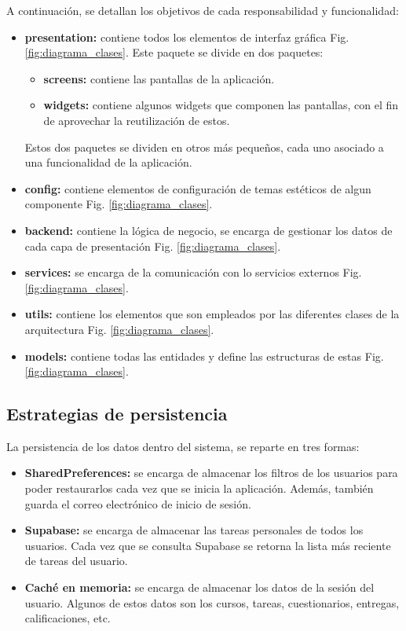 A continuación, se detallan los objetivos de cada responsabilidad y funcionalidad:
\begin{itemize}
    \item \textbf{presentation:} contiene todos los elementos de interfaz gráfica Fig. \ref{fig:diagrama_clases}. Este paquete se divide en dos paquetes:
        \begin{itemize}
            \item \textbf{screens:} contiene las pantallas de la aplicación.
            \item \textbf{widgets:} contiene algunos widgets que componen las pantallas, con el fin de aprovechar la reutilización de estos.
        \end{itemize}
        Estos dos paquetes se dividen en otros más pequeños, cada uno asociado a una funcionalidad de la aplicación.
    \item \textbf{config:} contiene elementos de configuración de temas estéticos de algun componente Fig. \ref{fig:diagrama_clases}.
    \item \textbf{backend:} contiene la lógica de negocio, se encarga de gestionar los datos de cada capa de presentación Fig. \ref{fig:diagrama_clases}.
    \item \textbf{services:} se encarga de la comunicación con lo servicios externos Fig. \ref{fig:diagrama_clases}.
    \item \textbf{utils:} contiene los elementos que son empleados por las diferentes clases de la arquitectura Fig. \ref{fig:diagrama_clases}.
    \item \textbf{models:} contiene todas las entidades y define las estructuras de estas Fig. \ref{fig:diagrama_clases}.
\end{itemize}

\subsection{Estrategias de persistencia}
La persistencia de los datos dentro del sistema, se reparte en tres formas:
\begin{itemize}
    \item \textbf{SharedPreferences:} se encarga de almacenar los filtros de los usuarios para poder restaurarlos cada vez que se inicia la aplicación. Además, también guarda el correo electrónico de inicio de sesión.
    \item \textbf{Supabase:} se encarga de almacenar las tareas personales de todos los usuarios. Cada vez que se consulta Supabase se retorna la lista más reciente de tareas del usuario.
    \item \textbf{Caché en memoria:} se encarga de almacenar los datos de la sesión del usuario. Algunos de estos datos son los cursos, tareas, cuestionarios, entregas, calificaciones, etc.
\end{itemize}

